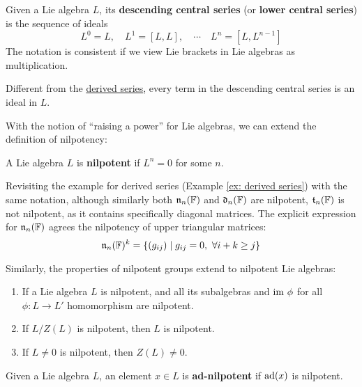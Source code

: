 \documentclass{article}
\begin{document}
\begin{definition}
    Given a Lie algebra $L$, its \textbf{descending central series} (or \textbf{lower central series}) is the sequence of ideals
    \[
        L^{0} = L, \quad L^{1} = [L, L], \quad \cdots \quad L^{n} = [L, L^{n-1}]
    \]
    The notation is consistent if we view Lie brackets in Lie algebras as multiplication.
\end{definition}
\nogap
\begin{remark}
    Different from the \hyperref[def: derived series]{derived series}, every term in the descending central series is an ideal in $L$.
\end{remark}

\textstart
With the notion of ``raising a power'' for Lie algebras, we can extend the definition of nilpotency:

\begin{definition}
    A Lie algebra $L$ is \textbf{nilpotent} if $L^{n} = 0$ for some $n$.
\end{definition}
\nogap
\begin{example}
    Revisiting the example for derived series (Example \ref{ex: derived series}) with the same notation, although similarly both $\mathfrak{n}_n(\mathbb{F})$ and $\mathfrak{d}_n(\mathbb{F})$ are nilpotent, $\mathfrak{t}_n(\mathbb{F})$ is not nilpotent, as it contains specifically diagonal matrices. The explicit expression for $\mathfrak{n}_n(\mathbb{F})$ agrees the nilpotency of upper triangular matrices:
    \[
        \mathfrak{n}_n(\mathbb{F})^k = \{ (g_{ij}) \mid g_{ij} = 0,\ \forall i + k \geq j \}
    \]
\end{example}

\begin{remark}
    Similarly, the properties of nilpotent groups extend to nilpotent Lie algebras:
    \begin{enumerate}
        \item If a Lie algebra $L$ is nilpotent, and all its subalgebras and $\mathrm{im}\  \phi$ for all $\phi: L \to L'$ homomorphism are nilpotent. 
        \item If $L/Z(L)$ is nilpotent, then $L$ is nilpotent.
        \item If $L \neq 0$ is nilpotent, then $Z(L) \neq 0$.
    \end{enumerate}
\end{remark}

\begin{definition}[Ad-nilpotent]
    Given a Lie algebra $L$, an element $x \in L$ is \textbf{ad-nilpotent} if $\operatorname{ad}(x)$ is nilpotent.
\end{definition}
\end{document}

